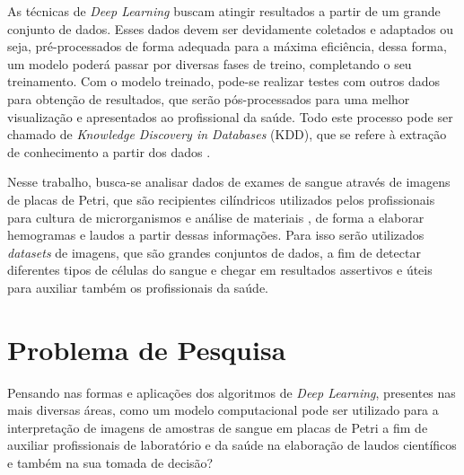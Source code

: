 As técnicas de \emph{Deep Learning} buscam atingir resultados a partir de um grande conjunto de dados. Esses dados devem ser devidamente coletados e adaptados ou seja, pré-processados de forma adequada para a máxima eficiência, dessa forma, um modelo poderá passar por diversas fases de treino, completando o seu treinamento. Com o modelo treinado, pode-se realizar testes com outros dados para obtenção de resultados, que serão pós-processados para uma melhor visualização e apresentados ao profissional da saúde. Todo este processo pode ser chamado de \emph{Knowledge Discovery in Databases} (KDD), que se refere à extração de conhecimento a partir dos dados \cite{kdd} \cite{kdd2}.

Nesse trabalho, busca-se analisar dados de exames de sangue através de imagens de placas de Petri, que são recipientes cilíndricos utilizados pelos profissionais para cultura de microrganismos e análise de materiais \cite{petri}, de forma a elaborar hemogramas e laudos a partir dessas informações. Para isso serão utilizados \emph{datasets} de imagens, que são grandes conjuntos de dados, a fim de detectar diferentes tipos de células do sangue e chegar em resultados assertivos e úteis para auxiliar também os profissionais da saúde.


\section{Problema de Pesquisa}
\label{sec:problema}

Pensando nas formas e aplicações dos algoritmos de \emph{Deep Learning}, presentes nas mais diversas áreas, como um modelo computacional pode ser utilizado para a interpretação de imagens de amostras de sangue em placas de Petri a fim de auxiliar profissionais de laboratório e da saúde na elaboração de laudos científicos e também na sua tomada de decisão?



